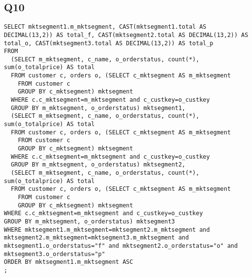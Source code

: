 \documentclass[12pt]{article}
\begin{document}
\subsection*{Q10}
\begin{lstlisting}
SELECT mktsegment1.m_mktsegment, CAST(mktsegment1.total AS DECIMAL(13,2)) AS total_f, CAST(mktsegment2.total AS DECIMAL(13,2)) AS total_o, CAST(mktsegment3.total AS DECIMAL(13,2)) AS total_p
FROM 
  (SELECT m_mktsegment, c_name, o_orderstatus, count(*), sum(o_totalprice) AS total
  FROM customer c, orders o, (SELECT c_mktsegment AS m_mktsegment
    FROM customer c
    GROUP BY c_mktsegment) mktsegment
  WHERE c.c_mktsegment=m_mktsegment and c_custkey=o_custkey
  GROUP BY m_mktsegment, o_orderstatus) mktsegment1,
  (SELECT m_mktsegment, c_name, o_orderstatus, count(*), sum(o_totalprice) AS total
  FROM customer c, orders o, (SELECT c_mktsegment AS m_mktsegment
    FROM customer c
    GROUP BY c_mktsegment) mktsegment
  WHERE c.c_mktsegment=m_mktsegment and c_custkey=o_custkey
  GROUP BY m_mktsegment, o_orderstatus) mktsegment2,
  (SELECT m_mktsegment, c_name, o_orderstatus, count(*), sum(o_totalprice) AS total
  FROM customer c, orders o, (SELECT c_mktsegment AS m_mktsegment
    FROM customer c
    GROUP BY c_mktsegment) mktsegment
WHERE c.c_mktsegment=m_mktsegment and c_custkey=o_custkey
GROUP BY m_mktsegment, o_orderstatus) mktsegment3
WHERE mktsegment1.m_mktsegment=mktsegment2.m_mktsegment and mktsegment2.m_mktsegment=mktsegment3.m_mktsegment and mktsegment1.o_orderstatus="f" and mktsegment2.o_orderstatus="o" and mktsegment3.o_orderstatus="p"
ORDER BY mktsegment1.m_mktsegment ASC
;
\end{lstlisting}
\end{document}

